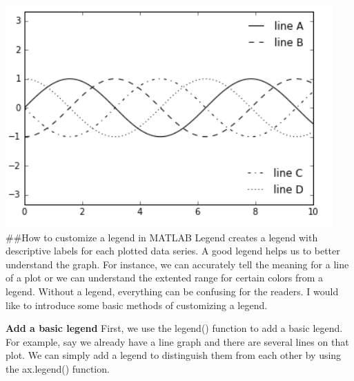 \documentclass[]{book}
\newenvironment{Shaded}{\begin{snugshade}}{\end{snugshade}}
\newcommand{\KeywordTok}[1]{\textcolor[rgb]{0.13,0.29,0.53}{\textbf{#1}}}
\newcommand{\DataTypeTok}[1]{\textcolor[rgb]{0.13,0.29,0.53}{#1}}
\newcommand{\NormalTok}[1]{#1}
\theoremstyle{definition}
\theoremstyle{definition}
\theoremstyle{definition}
\theoremstyle{remark}
\begin{document}
\includegraphics{images/legend5.png} \#\#How to customize a legend in
MATLAB Legend creates a legend with descriptive labels for each plotted
data series. A good legend helps us to better understand the graph. For
instance, we can accurately tell the meaning for a line of a plot or we
can understand the extented range for certain colors from a legend.
Without a legend, everything can be confusing for the readers. I would
like to introduce some basic methods of customizing a legend.

\textbf{Add a basic legend} First, we use the legend() function to add a
basic legend. For example, say we already have a line graph and there
are several lines on that plot. We can simply add a legend to
distinguish them from each other by using the ax.legend() function.

\begin{Shaded}
\end{Shaded}
\end{document}
